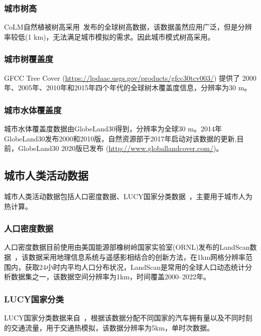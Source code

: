 \subsubsection{城市树高}\label{城市树高数据}
CoLM自然植被树高采用~\citet{simard2011mapping}发布的全球树高数据，该数据虽然应用广泛，但是分辨率较低(1 km)，无法满足城市模拟的需求。因此城市模式树高采用\citet{lang2023high}。

\subsubsection{城市树覆盖度}
GFCC Tree Cover (\url{https://lpdaac.usgs.gov/products/gfcc30tcv003/}) 提供了
2000年、2005年、2010年和2015年四个年代的全球树木覆盖度信息，分辨率为30 m。

\subsubsection{城市水体覆盖度}\label{城市水体覆盖度}
城市水体覆盖度数据由GlobeLand30得到，分辨率为全球30 m。2014年GlobeLand30发布2000和2010版，自然资源部于2017年启动对该数据的更新,目前，GlobeLand30 2020版已发布 (\url{http://www.globallandcover.com/})。


\subsection{城市人类活动数据}\label{城市人类活动数据}

城市人类活动数据包括人口密度数据、LUCY国家分类数据~\citep{allen2011}，主要用于城市人为热计算。

\subsubsection{人口密度数据}\label{人口密度数据}
人口密度数据目前使用由美国能源部橡树岭国家实验室(ORNL)发布的LandScan数据~\citep{brightLandScanGlobal20002001}，该数据采用地理信息系统与遥感影相结合的创新方法，在1km网格分辨率范围内，获取24小时内平均人口分布状况，LandScan是常用的全球人口动态统计分析数据集之一，该数据空间分辨率为1km，时间覆盖2000--2022年。

\subsubsection{LUCY国家分类}\label{LUCY国家分类}
LUCY国家分类数据来自~\citet{allen2011}，根据该数据分配不同国家的汽车拥有量以及不同时刻的交通流量，用于交通热模拟，该数据分辨率为5km，单时次数据。



